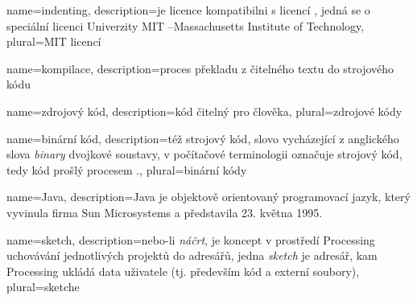 {
  name={indenting},
  description={je licence kompatibilni s licencí , jedná se o speciální licenci Univerzity MIT --Massachusetts Institute of Technology},
  plural={MIT licencí}
}


{
	name={kompilace},
	description={proces překladu z čitelného textu do strojového kódu}
}

{
	name={zdrojový kód},
	description={kód čitelný pro člověka},
	plural={zdrojové kódy}
}

{
	name={binární kód},
	description={též strojový kód, slovo vycházející z anglického slova {\em binary} dvojkové soustavy, v počítačové terminologii označuje strojový kód, tedy kód prošlý procesem .},
	plural={binární kódy}
}

{
	name={Java},
	description={Java je objektově orientovaný programovací jazyk, který vyvinula firma Sun Microsystems a představila 23. května 1995.}
}

{
	name={sketch},
	description={nebo-li {\em náčrt}, je koncept v prostředí Processing uchovávání jednotlivých projektů do adresářů, jedna {\em sketch} je adresář, kam Processing ukládá data uživatele (tj. především kód a externí soubory)},
	plural={sketche}
}

